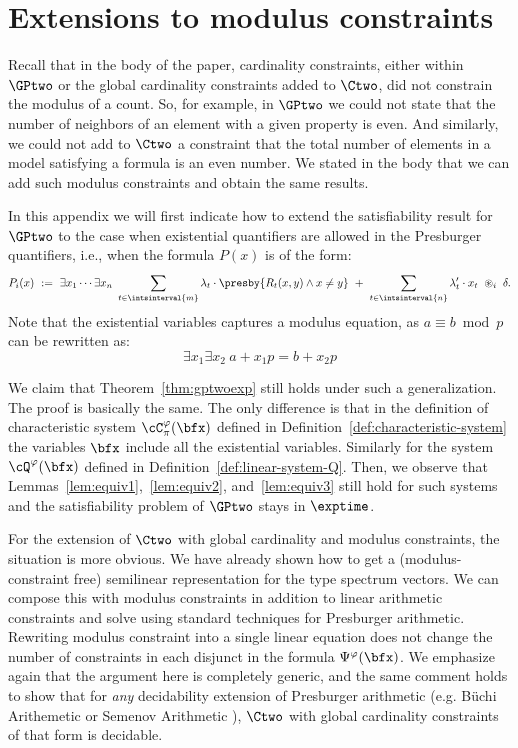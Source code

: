\section{Extensions to modulus constraints}

Recall that in the body of the paper, cardinality constraints, either within $\GPtwo$ or the global cardinality constraints added to $\Ctwo$, did not constrain the modulus of a count. So, for example, in $\GPtwo$ we could not state that the number of neighbors of an element with a given property is even. And similarly, we could not add to $\Ctwo$ a  constraint that the total number of elements in a model satisfying a formula is an even number. We stated in the body that we can add such modulus constraints and obtain the same results.

In this appendix we will first indicate how to extend the satisfiability result for $\GPtwo$ to the case when existential quantifiers are allowed in the Presburger quantifiers, i.e., when the formula $P(x)$ is of the form:
\begin{equation*}
P_i(x)\ :=\ 
\exists x_1 \cdots \exists x_n\ \sum_{t \in \intsinterval{m}} \lambda_{t} \cdot \presby{R_t(x, y) \land x \neq y}
\ + \ \sum_{t\in \intsinterval{n}} \lambda_t'\cdot x_t
\ \circledast_i\ \delta.
\end{equation*}
Note that the existential variables captures a modulus equation, as $a \equiv b \bmod p$ can be rewritten as:
$$
\exists x_1\exists x_2\
a+x_1p = b+x_2p
$$

We claim that Theorem~\ref{thm:gptwoexp} still holds under such a generalization.
The proof is basically the same.
The only difference is that in the definition of characteristic system
$\cC^\varphi_\pi(\bfx)$
defined in Definition~\ref{def:characteristic-system} the variables $\bfx$ include all the existential variables.
Similarly for the system $\cQ^\varphi(\bfx)$
defined in Definition~\ref{def:linear-system-Q}.
Then, we observe that
Lemmas~\ref{lem:equiv1},~\ref{lem:equiv2}, and~\ref{lem:equiv3} still hold for such systems
and the satisfiability problem of $\GPtwo$ stays in $\exptime$.

For the extension of $\Ctwo$ with global cardinality and modulus constraints, the situation is more obvious. We have already shown how to get a (modulus-constraint free) semilinear representation for the type spectrum vectors. We can compose this with modulus constraints in addition to linear arithmetic constraints and solve using standard techniques for Presburger arithmetic. 
Rewriting modulus constraint into a single linear equation does not change the number of constraints in each disjunct in the formula $\Psi^{\varphi}(\bfx)$.
We emphasize again that the argument here is completely generic, and the same comment holds to show that for \emph{any} decidability extension of Presburger arithmetic (e.g. B\"uchi Arithemetic or Semenov Arithmetic \cite{semenovpresexp}), $\Ctwo$ with global cardinality constraints of that form is decidable.
